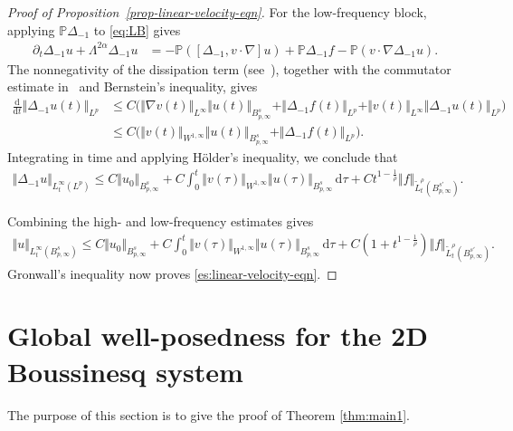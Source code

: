 \documentclass[reqno,11pt,a4paper]{amsart}
\newcommand{\dd}{\mathrm{d}}
\begin{document}
\begin{proof}[Proof of Proposition~\ref{prop-linear-velocity-eqn}]
For the low-frequency block, applying
$\mathbb P\Delta_{-1}$ to \eqref{eq:LB} gives
\begin{align*}
  \partial_t\Delta_{-1}u
  +\Lambda^{2\alpha}\Delta_{-1}u
  &=
  -\mathbb P([\Delta_{-1},v\cdot\nabla]u)
  +\mathbb P\Delta_{-1}f
  -\mathbb P(v\cdot\nabla\Delta_{-1}u).
\end{align*}
The nonnegativity of the dissipation term
(see~\cite{CorC04}), together with the commutator estimate
in~\cite[Lemma~2.100]{BCD11}
and Bernstein's inequality, gives
\begin{align*}
  \frac{\dd}{\dd t}\Vert \Delta_{-1}u(t)\Vert _{L^p}
  &\leq
  C\Big(
    \Vert \nabla v(t)\Vert _{L^\infty}
    \Vert u(t)\Vert _{B^s_{p,\infty}}
    +\Vert \Delta_{-1}f(t)\Vert _{L^p}
    +\Vert v(t)\Vert _{L^\infty}\Vert \Delta_{-1}u(t)\Vert _{L^p}
  \Big)
  \\
  &\leq
  C\Big(
    \Vert v(t)\Vert _{W^{1,\infty}}
    \Vert u(t)\Vert _{B^s_{p,\infty}}
    +\Vert \Delta_{-1}f(t)\Vert _{L^p}
  \Big).
\end{align*}
Integrating in time and applying H\"older's inequality,
we conclude that
\begin{align*}
  \Vert \Delta_{-1}u\Vert _{L^\infty_t(L^p)}
  \leq
  C\Vert u_0\Vert _{B^s_{p,\infty}}
  +C\int_0^t
    \Vert v(\tau)\Vert _{W^{1,\infty}}
    \Vert u(\tau)\Vert _{B^s_{p,\infty}}\,\dd\tau
  +
  Ct^{1-\frac1\rho}
  \Vert f\Vert _{\widetilde L^\rho_t(B^{s'}_{p,\infty})}.
\end{align*}

Combining the high- and low-frequency estimates gives
\begin{align*}
  \Vert u\Vert _{L^\infty_t(B^s_{p,\infty})}
  \leq
  C\Vert u_0\Vert _{B^s_{p,\infty}}
  +C\int_0^t
    \Vert v(\tau)\Vert _{W^{1,\infty}}
    \Vert u(\tau)\Vert _{B^s_{p,\infty}}\,\dd\tau
  +
  C(1+t^{1-\frac1\rho})
  \Vert f\Vert _{\widetilde L^\rho_t(B^{s'}_{p,\infty})}.
\end{align*}
Gronwall's inequality now proves
\eqref{es:linear-velocity-eqn}.
\end{proof}


\section{Global well-posedness for the 2D Boussinesq system}
\label{sec:well-pose}
The purpose of this section is to give the proof of Theorem \ref{thm:main1}. 
\end{document}
